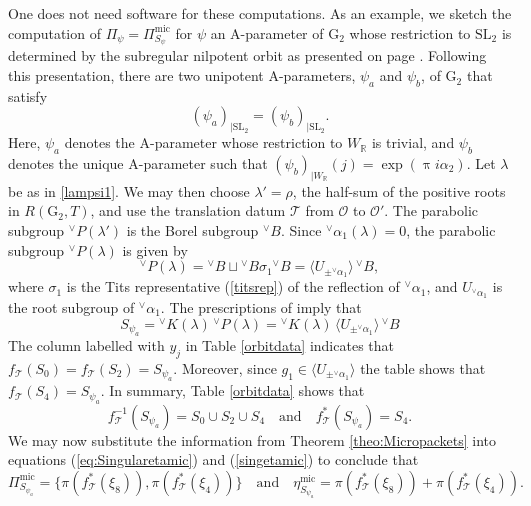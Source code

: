 \documentclass[a4paper, 11pt]{article}
\newcommand{\R}{\mathbb{R}}
\begin{document}
One does not need software for these computations.  As an
example, we sketch the  computation of  $\Pi_\psi =
\Pi_{S_{\psi}}^{\mathrm{mic}}$ for $\psi$ an A-parameter of 
$\mathrm{G}_{2}$ whose restriction to $\mathrm{SL}_2$ is
determined by the subregular nilpotent orbit as presented on page
\pageref{lampsi}.  Following this presentation, there are two unipotent
A-parameters, $\psi_a$ and $\psi_b$, of $\mathrm{G}_{2}$ that satisfy 
$$(\psi_a)_{|\mathrm{SL}_2}= (\psi_b)_{|\mathrm{SL}_2}.$$
Here, $\psi_a$ denotes the A-parameter whose restriction to $W_\R$
is trivial,  and $\psi_b$ denotes the unique A-parameter such that 
$(\psi_b)_{|W_{\mathbb{R}}}(j) = \exp(\uppi i \alpha_2)$. 
Let $\lambda$ be as in \eqref{lampsi1}. We may then choose  
$\lambda' = \rho$, the half-sum of the positive roots in
$R(\mathrm{G}_{2},T)$, and use the translation datum
$\mathcal{T}$ from $\mathcal{O}$ to $\mathcal{O}'$. The parabolic
subgroup ${^\vee}P(\lambda')$ is the Borel subgroup ${^\vee}B$.   Since
${^\vee}\alpha_{1}(\lambda) = 0$, the
parabolic subgroup ${^\vee}P(\lambda)$ is given by
\[
{}^{\vee}P(\lambda)={}^{\vee}B \sqcup {}^{\vee}B
\sigma_{1} {}^{\vee}B = \langle U_{\pm {^\vee}\alpha_{1}} \rangle \,  {^\vee}B,
\]  
where $\sigma_{1}$ is the Tits representative (\ref{titsrep}) of the reflection
of ${^\vee}\alpha_{1}$, and 
$U_{{^\vee}\alpha_{1}}$ is the root subgroup of ${^\vee}\alpha_{1}$.
The prescriptions of \cite[(22.8)(c), (5.7)(c) and Proposition 6.17]{ABV}
imply that 
$$S_{\psi_a}={}^{\vee}K(\lambda)\,  {}^{\vee}P(\lambda) =
{}^{\vee}K(\lambda)\,  \langle U_{\pm {^\vee}\alpha_{1}} \rangle \,
{^\vee}B$$ 
The column labelled with $y_{j}$ in Table \ref{orbitdata} indicates
that  $f_\mathcal{T}(S_0)=f_\mathcal{T}(S_2)=S_{\psi_a}$. Moreover,
since $g_{1} \in \langle U_{\pm {^\vee}\alpha_{1}} \rangle$ 
the table shows that $f_\mathcal{T}(S_4)=S_{\psi_a}$.  In summary,
Table \ref{orbitdata} shows that
\[
f^{-1}_{\mathcal{T}}(S_{\psi_a}) = S_0 \cup S_2 \cup S_4 \quad \text{and} \quad
f^{\ast}_{\mathcal{T}}(S_{\psi_a}) = S_4.
\]
We may now substitute the information from Theorem
\ref{theo:Micropackets}   into equations 
(\ref{eq:Singularetamic}) and (\ref{singetamic}) to
conclude that 
\[
\Pi_{S_{\psi_a}}^{\mathrm{mic}} =
\{\pi(f^{\ast}_{\mathcal{T}}(\xi_8)),
\pi(f^{\ast}_{\mathcal{T}}(\xi_4))\}  
\quad \text{and} \quad
\eta_{S_{\psi_a}}^{\mathrm{mic}} = \pi(f^{\ast}_{\mathcal{T}}(\xi_8))
+ \pi(f^{\ast}_{\mathcal{T}}(\xi_4)). 
\]
\end{document}
